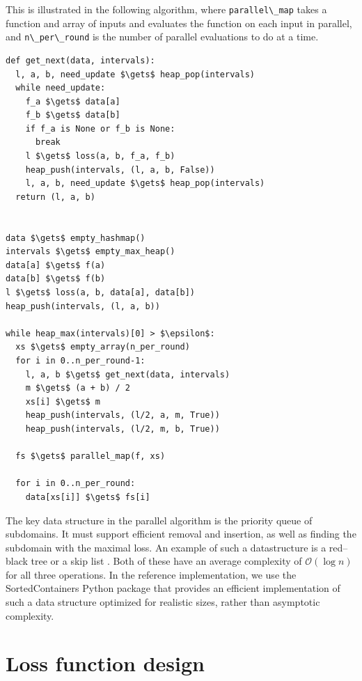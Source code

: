 
This is illustrated in the following algorithm, where \passthrough{\lstinline!parallel\_map!} takes a function and array of inputs and evaluates the function on each input in parallel, and \passthrough{\lstinline!n\_per\_round!} is the number of parallel evaluations to do at a time.

\begin{lstlisting}
def get_next(data, intervals):
  l, a, b, need_update $\gets$ heap_pop(intervals)
  while need_update:
    f_a $\gets$ data[a]
    f_b $\gets$ data[b]
    if f_a is None or f_b is None:
      break
    l $\gets$ loss(a, b, f_a, f_b)
    heap_push(intervals, (l, a, b, False))
    l, a, b, need_update $\gets$ heap_pop(intervals)
  return (l, a, b)


data $\gets$ empty_hashmap()
intervals $\gets$ empty_max_heap()
data[a] $\gets$ f(a)
data[b] $\gets$ f(b)
l $\gets$ loss(a, b, data[a], data[b])
heap_push(intervals, (l, a, b))

while heap_max(intervals)[0] > $\epsilon$:
  xs $\gets$ empty_array(n_per_round)
  for i in 0..n_per_round-1:
    l, a, b $\gets$ get_next(data, intervals)
    m $\gets$ (a + b) / 2
    xs[i] $\gets$ m
    heap_push(intervals, (l/2, a, m, True))
    heap_push(intervals, (l/2, m, b, True))

  fs $\gets$ parallel_map(f, xs)

  for i in 0..n_per_round:
    data[xs[i]] $\gets$ fs[i]
\end{lstlisting}


The key data structure in the parallel algorithm is the priority queue of subdomains.
It must support efficient removal and insertion, as well as finding the subdomain with the maximal loss.
An example of such a datastructure is a red--black tree or a skip list .
Both of these have an average complexity of $\mathcal{O}(\log{n})$ for all three operations.
In the reference implementation, we use the SortedContainers Python package that provides an efficient implementation of such a data structure optimized for realistic sizes, rather than asymptotic complexity.

\section{Loss function design}

